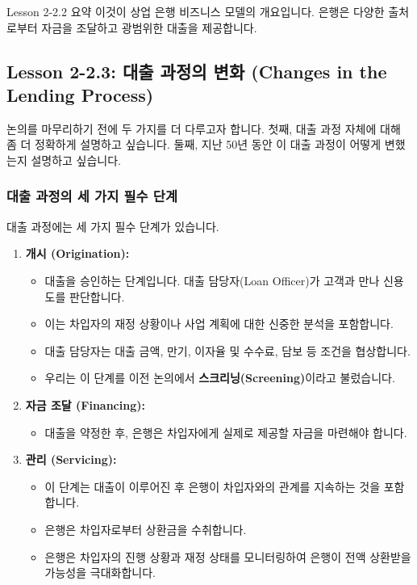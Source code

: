 \documentclass[11pt,a4paper]{article}
\theoremstyle{definition}
\begin{document}
\begin{summarybox}{Lesson 2-2.2 요약}
이것이 상업 은행 비즈니스 모델의 개요입니다. 은행은 다양한 출처로부터 자금을 조달하고 광범위한 대출을 제공합니다.
\end{summarybox}

\newpage
\subsection{Lesson 2-2.3: 대출 과정의 변화 (Changes in the Lending Process)}

논의를 마무리하기 전에 두 가지를 더 다루고자 합니다. 첫째, 대출 과정 자체에 대해 좀 더 정확하게 설명하고 싶습니다. 둘째, 지난 50년 동안 이 대출 과정이 어떻게 변했는지 설명하고 싶습니다.

\subsubsection*{대출 과정의 세 가지 필수 단계}
대출 과정에는 세 가지 필수 단계가 있습니다.
\begin{enumerate}
    \item \textbf{개시 (Origination):}
    \begin{itemize}
        \item 대출을 승인하는 단계입니다. 대출 담당자(Loan Officer)가 고객과 만나 신용도를 판단합니다.
        \item 이는 차입자의 재정 상황이나 사업 계획에 대한 신중한 분석을 포함합니다.
        \item 대출 담당자는 대출 금액, 만기, 이자율 및 수수료, 담보 등 조건을 협상합니다.
        \item 우리는 이 단계를 이전 논의에서 \textbf{스크리닝(Screening)}이라고 불렀습니다.
    \end{itemize}

    \item \textbf{자금 조달 (Financing):}
    \begin{itemize}
        \item 대출을 약정한 후, 은행은 차입자에게 실제로 제공할 자금을 마련해야 합니다.
    \end{itemize}

    \item \textbf{관리 (Servicing):}
    \begin{itemize}
        \item 이 단계는 대출이 이루어진 후 은행이 차입자와의 관계를 지속하는 것을 포함합니다.
        \item 은행은 차입자로부터 상환금을 수취합니다.
        \item 은행은 차입자의 진행 상황과 재정 상태를 모니터링하여 은행이 전액 상환받을 가능성을 극대화합니다.
    \end{itemize}
\end{enumerate}
\end{document}
